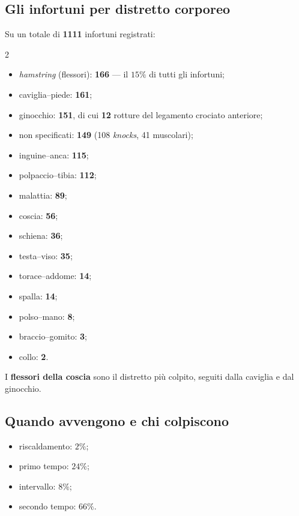 \subsection{Gli infortuni per distretto corporeo}

Su un totale di \textbf{1111} infortuni registrati:

\begin{multicols}{2}
\begin{itemize}
  \item \textit{hamstring} (flessori): \textbf{166} --- il $15\%$ di tutti gli infortuni;
  \item caviglia--piede: \textbf{161};
  \item ginocchio: \textbf{151}, di cui \textbf{12} rotture del legamento crociato anteriore;
  \item non specificati: \textbf{149} (108 \textit{knocks}, 41 muscolari);
  \item inguine--anca: \textbf{115};
  \item polpaccio--tibia: \textbf{112};
  \item malattia: \textbf{89};
  \item coscia: \textbf{56};
  \item schiena: \textbf{36};
  \item testa--viso: \textbf{35};
  \item torace--addome: \textbf{14};
  \item spalla: \textbf{14};
  \item polso--mano: \textbf{8};
  \item braccio--gomito: \textbf{3};
  \item collo: \textbf{2}.
\end{itemize}
\end{multicols}

I \textbf{flessori della coscia} sono il distretto più colpito, seguiti dalla caviglia e dal
ginocchio.

\subsection{Quando avvengono e chi colpiscono}

\begin{itemize}
  \item riscaldamento: $2\%$;
  \item primo tempo: $24\%$;
  \item intervallo: $8\%$;
  \item secondo tempo: $66\%$.
\end{itemize}

